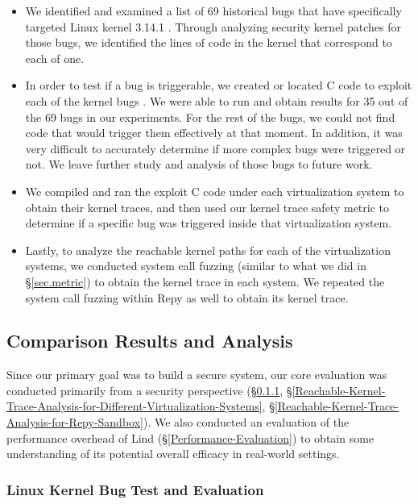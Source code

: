 \begin{itemize}
\item We identified and examined a list of  69 historical bugs that have
specifically 
targeted Linux kernel 3.14.1 \cite{CVE-Datasource}. Through analyzing
security kernel patches for those bugs, 
we identified the lines of code in the kernel that correspond to each of
one.

\item In order to test if a bug is triggerable, we created or located C
code to 
exploit each of the kernel bugs \cite{Exploit-Database}. We were able to
run and obtain results for 
35 out of the 69 bugs in our experiments. For the rest of the bugs, 
we could not find code that would trigger them effectively at that
moment. 
In addition, it was very difficult to accurately determine if more complex
bugs 
were triggered or not. We leave further study and analysis of those bugs to
future work.

\item We compiled and ran the exploit C code under each virtualization
system to 
obtain their kernel traces, and then used our kernel trace safety metric to
determine 
if a specific bug was triggered inside that virtualization system. 

\item Lastly, to  analyze the reachable kernel paths for each of the
virtualization systems, 
we conducted system call fuzzing (similar to what we did in \S{\ref{sec.metric}}) to obtain
the kernel trace in each system. 
We repeated the system call fuzzing within Repy as well to obtain its
kernel trace. 
\end{itemize}

\subsection{Comparison Results and Analysis}

Since our primary goal was to build a secure system, our core evaluation
was conducted primarily 
from a security perspective
(\S{\ref{Linux-Kernel-Bug-Test-and-Evaluation}}, 
\S{\ref{Reachable-Kernel-Trace-Analysis-for-Different-Virtualization-Systems}}, 
\S{\ref{Reachable-Kernel-Trace-Analysis-for-Repy-Sandbox}}). 
We also conducted an evaluation of the performance overhead of Lind
(\S{\ref{Performance-Evaluation}}) 
to obtain some understanding of its potential overall efficacy in
real-world settings.

\subsubsection{Linux Kernel Bug Test and Evaluation}
\label{Linux-Kernel-Bug-Test-and-Evaluation}


